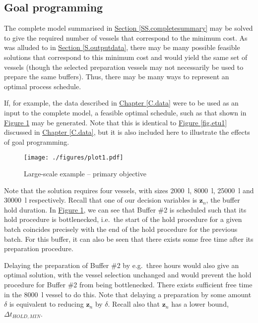 \subsection{Goal programming}\label{SS.goal}
The complete model summarised in 
\hyperref[SS.completesummary]{Section \ref*{SS.completesummary}} may be solved
to give the required number of vessels that correspond to the minimum cost.
As was alluded to in \hyperref[S.outputdata]{Section \ref*{S.outputdata}},
there may be many possible feasible solutions that correspond to this minimum
cost and would yield the same set of vessels (though the selected preparation
vessels may not necessarily be used to prepare the same buffers).
Thus, there may be many ways to represent an optimal process schedule.

If, for example, the data described in
\hyperref[C.data]{Chapter \ref*{C.data}} were to be used as an input to the
complete model, a feasible optimal schedule, such as that shown in
\hyperref[fig.primary]{Figure \ref*{fig.primary}} may be generated.
Note that this is identical to \hyperref[fig.etu1]{Figure \ref*{fig.etu1}}
discussed in \hyperref[C.data]{Chapter \ref*{C.data}},
but it is also included here to illustrate the effects of goal programming.

\begin{figure}
    \centering
    \texttt{[image: ./figures/plot1.pdf]}
    \caption{Large-scale example -- primary objective}
    \label{fig.primary}
\end{figure}
Note that the solution requires four vessels, with sizes
\SI{2000}{\litre}, \SI{8000}{\litre}, \SI{25000}{\litre} and \SI{30000}{\litre}
respectively.  
Recall that one of our decision variables is $\boldsymbol{z}_{n}$, the buffer
hold duration.
In \hyperref[fig.primary]{Figure \ref*{fig.primary}}, we can see that Buffer
\#2 is scheduled such that its hold procedure is bottlenecked, i.e.\ the start
of the hold procedure for a given batch coincides precisely with the end of the
hold procedure for the previous batch.
For this buffer, it can also be seen that there exists some free time after
its preparation procedure.

Delaying the preparation of Buffer \#2 by e.g.\ three hours would
also give an optimal solution, with the vessel selection unchanged and would
prevent the hold procedure for Buffer \#2 from being bottlenecked.
There exists sufficient free time in the \SI{8000}{\litre} vessel to do this.
Note that delaying a preparation by some amount $\delta$ is equivalent to 
reducing $\boldsymbol{z}_{n}$ by $\delta$.
Recall also that $\boldsymbol{z}_{n}$ has a lower bound, 
$\Delta t_{\mathit{HOLD,MIN}}$.

